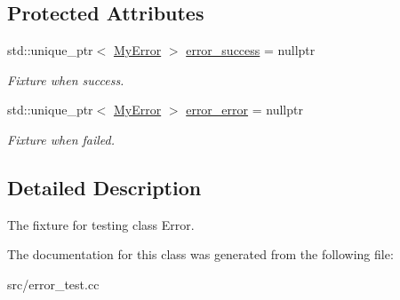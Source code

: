 \subsection*{Protected Attributes}
\begin{DoxyCompactItemize}
\item 
\hypertarget{class_error_test_a0f59553359b5a5fc50771e391478c1f4}{}\label{class_error_test_a0f59553359b5a5fc50771e391478c1f4} 
std\+::unique\+\_\+ptr$<$ \hyperlink{class_my_error}{My\+Error} $>$ \hyperlink{class_error_test_a0f59553359b5a5fc50771e391478c1f4}{error\+\_\+success} = nullptr
\begin{DoxyCompactList}\small\item\em Fixture when success. \end{DoxyCompactList}\item 
\hypertarget{class_error_test_a3f26eee630d733a24b1b192453abdc36}{}\label{class_error_test_a3f26eee630d733a24b1b192453abdc36} 
std\+::unique\+\_\+ptr$<$ \hyperlink{class_my_error}{My\+Error} $>$ \hyperlink{class_error_test_a3f26eee630d733a24b1b192453abdc36}{error\+\_\+error} = nullptr
\begin{DoxyCompactList}\small\item\em Fixture when failed. \end{DoxyCompactList}\end{DoxyCompactItemize}


\subsection{Detailed Description}
The fixture for testing class Error. 

The documentation for this class was generated from the following file\+:\begin{DoxyCompactItemize}
\item 
src/error\+\_\+test.\+cc\end{DoxyCompactItemize}

